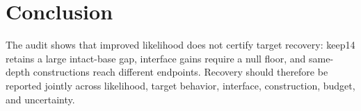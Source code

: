 \section{Conclusion}
\label{sec:conclusion}

The audit shows that improved likelihood does not certify target recovery:
keep14 retains a large intact-base gap, interface gains require a null floor,
and same-depth constructions reach different endpoints. Recovery should
therefore be reported jointly across likelihood, target behavior, interface,
construction, budget, and uncertainty.
